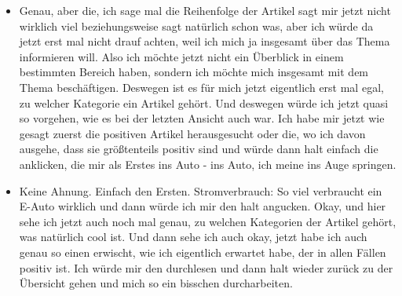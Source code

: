 {\begin{itemize}[]
              So wie ich es jetzt verstehe, dem Markt sind jetzt keine Artikel zugeordnet und hier wäre es jetzt ein bisschen schwierig für mich zu verstehen.
              Ach so, das sind ah, okay, das ist mir eben gerade auch noch nicht klar geworden, diese Zahlen, die geben nicht bestimmte Welten an oder bestimmte Zustände an.
              Also ich habe es so verstanden, dass jetzt die Null beispielsweise der Markt ist und die Eins, dann der nachfolgende Zustand.
              Aber was hier wirklich ausgesagt wird ist die Ebene, die angegeben wird.
              Also eine Ebene darunter wären dann die Artikel \flqq Stromverbrauch [...]\frqq{} und so weiter.
              Und \flqq Lohnt sich ein E-Auto [...]\frqq{}.
              Die würden dann so wie ich es jetzt verstehe hier am Staat und an diesem unbenannten, an dieser unbenannten Kategorie hängen.
              Und dann zweite Ebene wären halt hier die beiden, also die mit der acht und der sieben und dann dritte Ebene wäre hier unten die letzte Kategorie.
        \item {} Genau, aber die, ich sage mal die Reihenfolge der Artikel sagt mir jetzt nicht wirklich viel beziehungsweise sagt natürlich schon was, aber ich würde da jetzt erst mal nicht drauf achten, weil ich mich ja insgesamt über das Thema informieren will.
              Also ich möchte jetzt nicht ein Überblick in einem bestimmten Bereich haben, sondern ich möchte mich insgesamt mit dem Thema beschäftigen.
              Deswegen ist es für mich jetzt eigentlich erst mal egal, zu welcher Kategorie ein Artikel gehört.
              Und deswegen würde ich jetzt quasi so vorgehen, wie es bei der letzten Ansicht auch war.
              Ich habe mir jetzt wie gesagt zuerst die positiven Artikel herausgesucht oder die, wo ich davon ausgehe, dass sie größtenteils positiv sind und würde dann halt einfach die anklicken, die mir als Erstes ins Auto - ins Auto, ich meine ins Auge springen.
        \item {} Keine Ahnung.
              Einfach den Ersten.
              \flqq Stromverbrauch: So viel verbraucht ein E-Auto wirklich\frqq{} und dann würde ich mir den halt angucken.
              Okay, und hier sehe ich jetzt auch noch mal genau, zu welchen Kategorien der Artikel gehört, was natürlich cool ist.
              Und dann sehe ich auch okay, jetzt habe ich auch genau so einen erwischt, wie ich eigentlich erwartet habe, der in allen Fällen positiv ist.
              Ich würde mir den durchlesen und dann halt wieder zurück zu der Übersicht gehen und mich so ein bisschen durcharbeiten.

\end{itemize}}

